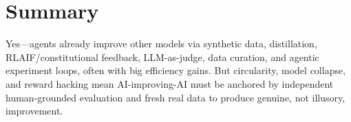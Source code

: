\documentclass[11pt]{article}
\begin{document}
\section{Summary}
Yes---agents already improve other models via synthetic data, distillation, RLAIF/constitutional feedback,
LLM-as-judge, data curation, and agentic experiment loops, often with big efficiency gains. But circularity,
model collapse, and reward hacking mean AI-improving-AI must be anchored by independent human-grounded
evaluation and fresh real data to produce genuine, not illusory, improvement.



\end{document}
